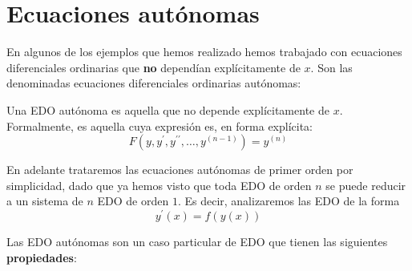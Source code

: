 \section{Ecuaciones autónomas}
En algunos de los ejemplos que hemos realizado hemos trabajado con ecuaciones diferenciales ordinarias que \textbf{no} dependían explícitamente de $x$. Son las denominadas ecuaciones diferenciales ordinarias autónomas:

\begin{definition}
Una EDO autónoma es aquella que no depende explícitamente de $x$. Formalmente, es aquella cuya expresión es, en forma explícita: $$F(y, y^\prime, y^{\prime\prime}, \hdots, y^{(n-1)}) = y^{(n)}$$
\end{definition}

En adelante trataremos las ecuaciones autónomas de primer orden por simplicidad, dado que ya hemos visto que toda EDO de orden $n$ se puede reducir a un sistema de $n$ EDO de orden $1$. Es decir, analizaremos las EDO de la forma $$y^\prime(x) = f(y(x))$$

Las EDO autónomas son un caso particular de EDO que tienen las siguientes \textbf{propiedades}:


